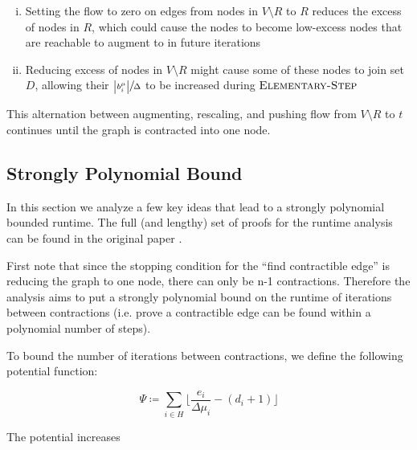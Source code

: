 \documentclass[11pt]{article}
\theoremstyle{definition}
\theoremstyle{definition}
\theoremstyle{definition}
\newcommand{\es}{\textsc{Elementary-Step}}
\begin{document}
\begin{enumerate}[(i),itemsep=0mm]
\item Setting the flow to zero on edges from nodes in $V\setminus R$ to $R$
	reduces the excess of nodes in $R$, which could cause the nodes to become
	low-excess nodes that are reachable to augment to in future iterations
\item Reducing excess of nodes in $V \setminus R$ might cause some of these nodes
	to join set $D$, allowing their $\sfrac{\abs{b_i^\mu}}{\Delta}$ to be increased
	during $\es$
\end{enumerate}

This alternation between augmenting, rescaling, and pushing flow from
$V \setminus R$ to $t$ continues until the graph is contracted into one node. 

\subsection{Strongly Polynomial Bound}
In this section we analyze a few key ideas that lead to a strongly polynomial bounded runtime. The full (and lengthy) set of proofs for the runtime analysis can be found in the original paper \cite{article}.

First note that since the stopping condition for the ``find contractible edge'' is reducing the graph to one node, there can only be n-1 contractions. Therefore the analysis aims to put a strongly polynomial bound on the runtime of iterations between contractions (i.e. prove a contractible edge can be found within a polynomial number of steps). 

To bound the number of iterations between contractions, we define the following potential function: 

\[ \Psi \coloneqq \sum_{i \in H}  \lfloor \frac{e_i}{\Delta \mu_i} - (d_i + 1) \rfloor \]

The potential increases 


\end{document}
